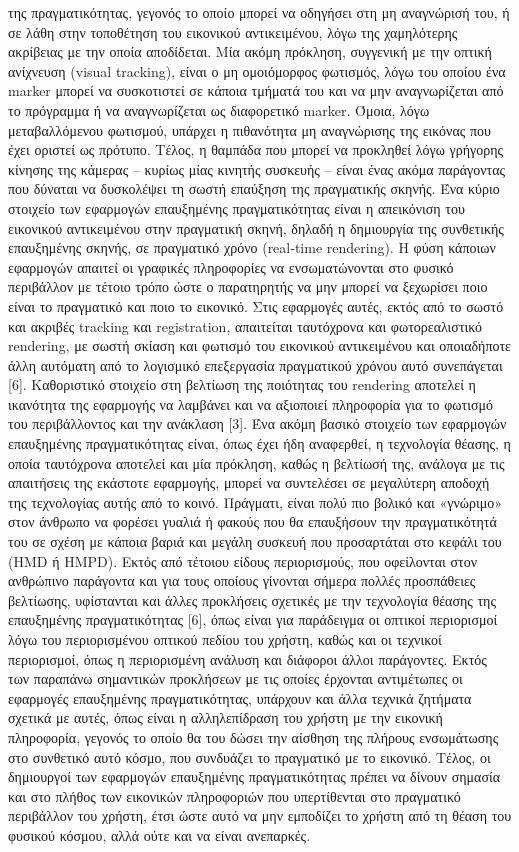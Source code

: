 της πραγματικότητας, γεγονός το οποίο μπορεί να οδηγήσει στη μη αναγνώρισή του, ή σε λάθη στην τοποθέτηση του εικονικού αντικειμένου, λόγω της χαμηλότερης ακρίβειας με την οποία αποδίδεται. Μία ακόμη πρόκληση, συγγενική με την οπτική ανίχνευση (visual tracking), είναι ο μη ομοιόμορφος φωτισμός, λόγω του οποίου ένα marker μπορεί να συσκοτιστεί σε κάποια τμήματά του και να μην αναγνωρίζεται από το πρόγραμμα ή να αναγνωρίζεται ως διαφορετικό marker. Όμοια, λόγω μεταβαλλόμενου φωτισμού, υπάρχει η πιθανότητα μη αναγνώρισης της εικόνας που έχει οριστεί ως πρότυπο. Τέλος, η θαμπάδα που μπορεί να προκληθεί λόγω γρήγορης κίνησης της κάμερας – κυρίως μίας κινητής συσκευής – είναι ένας ακόμα παράγοντας που δύναται να δυσκολέψει τη σωστή επαύξηση της πραγματικής σκηνής. Ένα κύριο στοιχείο των εφαρμογών επαυξημένης πραγματικότητας είναι η απεικόνιση του εικονικού αντικειμένου στην πραγματική σκηνή, δηλαδή η δημιουργία της συνθετικής επαυξημένης σκηνής, σε πραγματικό χρόνο (real-time rendering). Η φύση κάποιων εφαρμογών απαιτεί οι γραφικές πληροφορίες να ενσωματώνονται στο φυσικό περιβάλλον με τέτοιο τρόπο ώστε ο παρατηρητής να μην μπορεί να ξεχωρίσει ποιο είναι το πραγματικό και ποιο το εικονικό. Στις εφαρμογές αυτές, εκτός από το σωστό και ακριβές tracking και registration, απαιτείται ταυτόχρονα και φωτορεαλιστικό rendering, με σωστή σκίαση και φωτισμό του εικονικού αντικειμένου και οποιαδήποτε άλλη αυτόματη από το λογισμικό επεξεργασία πραγματικού χρόνου αυτό συνεπάγεται [6]. Καθοριστικό στοιχείο στη βελτίωση της ποιότητας του rendering αποτελεί η ικανότητα της εφαρμογής να λαμβάνει και να αξιοποιεί πληροφορία για το φωτισμό του περιβάλλοντος και την ανάκλαση [3]. Ένα ακόμη βασικό στοιχείο των εφαρμογών επαυξημένης πραγματικότητας είναι, όπως έχει ήδη αναφερθεί, η τεχνολογία θέασης, η οποία ταυτόχρονα αποτελεί και μία πρόκληση, καθώς η βελτίωσή της, ανάλογα με τις απαιτήσεις της εκάστοτε εφαρμογής, μπορεί να συντελέσει σε μεγαλύτερη αποδοχή της τεχνολογίας αυτής από το κοινό. Πράγματι, είναι πολύ πιο βολικό και «γνώριμο» στον άνθρωπο να φορέσει γυαλιά ή φακούς που θα επαυξήσουν την πραγματικότητά του σε σχέση με κάποια βαριά και μεγάλη συσκευή που προσαρτάται στο κεφάλι του (HMD ή HMPD). Εκτός από τέτοιου είδους περιορισμούς, που οφείλονται στον ανθρώπινο παράγοντα και για τους οποίους γίνονται σήμερα πολλές προσπάθειες βελτίωσης, υφίστανται και άλλες προκλήσεις σχετικές με την τεχνολογία θέασης της επαυξημένης πραγματικότητας [6], όπως είναι για παράδειγμα οι οπτικοί περιορισμοί λόγω του περιορισμένου οπτικού πεδίου του χρήστη, καθώς και οι τεχνικοί περιορισμοί, όπως η περιορισμένη ανάλυση και διάφοροι άλλοι παράγοντες. Εκτός των παραπάνω σημαντικών προκλήσεων με τις οποίες έρχονται αντιμέτωπες οι εφαρμογές επαυξημένης πραγματικότητας, υπάρχουν και άλλα τεχνικά ζητήματα σχετικά με αυτές, όπως είναι η αλληλεπίδραση του χρήστη με την εικονική πληροφορία, γεγονός το οποίο θα του δώσει την αίσθηση της πλήρους ενσωμάτωσης στο συνθετικό αυτό κόσμο, που συνδυάζει το πραγματικό με το εικονικό. Τέλος, οι δημιουργοί των εφαρμογών επαυξημένης πραγματικότητας πρέπει να δίνουν σημασία και στο πλήθος των εικονικών πληροφοριών που υπερτίθενται στο πραγματικό περιβάλλον του χρήστη, έτσι ώστε αυτό να μην εμποδίζει το χρήστη από τη θέαση του φυσικού κόσμου, αλλά ούτε και να είναι ανεπαρκές.
 
